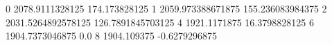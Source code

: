 0 2078.9111328125 174.173828125
1 2059.973388671875 155.236083984375
2 2031.5264892578125 126.7891845703125
4 1921.1171875 16.3798828125
6 1904.7373046875 0.0
8 1904.109375 -0.6279296875
